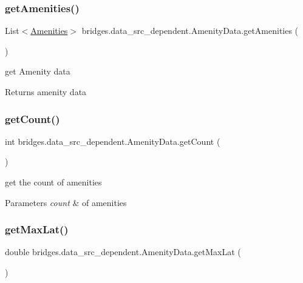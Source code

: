 \subsubsection{\texorpdfstring{get\+Amenities()}{getAmenities()}}
{\footnotesize\ttfamily List$<$\hyperlink{classbridges_1_1data__src__dependent_1_1_amenities}{Amenities}$>$ bridges.\+data\+\_\+src\+\_\+dependent.\+Amenity\+Data.\+get\+Amenities (\begin{DoxyParamCaption}{ }\end{DoxyParamCaption})}

get Amenity data \begin{DoxyReturn}{Returns}
amenity data 
\end{DoxyReturn}
\mbox{\label{classbridges_1_1data__src__dependent_1_1_amenity_data_a363ca9b4314fabbfa94cdc4c0f34ac96}} 
\subsubsection{\texorpdfstring{get\+Count()}{getCount()}}
{\footnotesize\ttfamily int bridges.\+data\+\_\+src\+\_\+dependent.\+Amenity\+Data.\+get\+Count (\begin{DoxyParamCaption}{ }\end{DoxyParamCaption})}

get the count of amenities 
\begin{DoxyParams}{Parameters}
{\em count} & of amenities \\
\hline
\end{DoxyParams}
\mbox{\label{classbridges_1_1data__src__dependent_1_1_amenity_data_a87f56862648652b9f5479fa1bd2c0fb0}} 
\subsubsection{\texorpdfstring{get\+Max\+Lat()}{getMaxLat()}}
{\footnotesize\ttfamily double bridges.\+data\+\_\+src\+\_\+dependent.\+Amenity\+Data.\+get\+Max\+Lat (\begin{DoxyParamCaption}{ }\end{DoxyParamCaption})}

